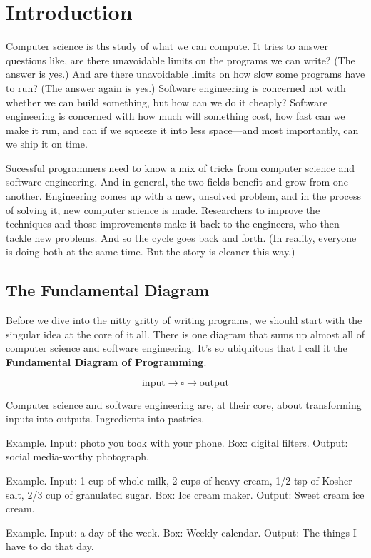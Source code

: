 \setchapterpreamble[u]{\margintoc}
\chapter{Introduction}

Computer science is ths study of what we can compute. It tries to answer questions like, are there unavoidable limits on the programs we can write? (The answer is yes.) And are there unavoidable limits on how slow some programs have to run? (The answer again is yes.) Software engineering is concerned not with whether we can build something, but how can we do it cheaply? Software engineering is concerned with how much will something cost, how fast can we make it run, and can if we squeeze it into less space---and most importantly, can we ship it on time.

Sucessful programmers need to know a mix of tricks from computer science and software engineering. And in general, the two fields benefit and grow from one another. Engineering comes up with a new, unsolved problem, and in the process of solving it, new computer science is made. Researchers to improve the techniques and those improvements make it back to the engineers, who then tackle new problems. And so the cycle goes back and forth. (In reality, everyone is doing both at the same time. But the story is cleaner this way.)

\section{The Fundamental Diagram}
Before we dive into the nitty gritty of writing programs, we should start with the singular idea at the core of it all. There is one diagram that sums up almost all of computer science and software engineering. It's so ubiquitous that I call it the \textbf{Fundamental Diagram of Programming}.

$$ \mathrm{input} \to \square \to \mathrm{output} $$

Computer science and software engineering are, at their core, about transforming inputs into outputs. Ingredients into pastries.

Example. Input: photo you took with your phone. Box: digital filters. Output: social media-worthy photograph.

Example. Input: 1 cup of whole milk, 2 cups of heavy cream, 1/2 tsp of Kosher salt, 2/3 cup of granulated sugar. Box: Ice cream maker. Output: Sweet cream ice cream.

Example. Input: a day of the week. Box: Weekly calendar. Output: The things I have to do that day.


